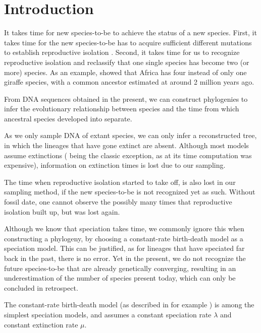 \section{Introduction}


It takes time for new species-to-be to achieve the status of a new species.
First, it takes time for the new species-to-be has 
to acquire sufficient different mutations to 
establish reproductive isolation \cite{schluter2001ecology}. Second, 
it takes time for us to recognize reproductive isolation
and reclassify that one single species has become two 
(or more) species. As an example, \cite{fennessy2016multi} 
showed that Africa has four instead of only one
giraffe species, with a common ancestor estimated 
at around 2 million years ago.


From DNA sequences obtained in the present, we can construct phylogenies
to infer the evolutionary relationship between species and the time 
from which ancestral species developed into separate.
  
As we only sample DNA of extant species, 
we can only infer a reconstructed tree, in which
the lineages that have gone extinct are absent.
Although most models assume extinctions (\cite{yule1925mathematical} being the
classic exception, as at its time computation was expensive), 
information on extinction times is lost due to our sampling.


The time when reproductive isolation started to take off, is
also lost in our sampling method, if the new species-to-be is not 
recognized yet as such. Without fossil date, one cannot observe the
possibly many times that reproductive isolation built up, but was lost again.


Although we know that speciation takes time, we commonly ignore this when
constructing a phylogeny, by choosing a constant-rate birth-death model
as a speciation model. This can be justified, as for lineages 
that have speciated far back in the past, there is no error. 
Yet in the present, we do not recognize the future species-to-be
that are already genetically converging, resulting in an underestimation
of the number of species present today, which can only be 
concluded in retrospect.

The constant-rate birth-death model (as described in for example \cite{nee1994reconstructed}) 
is among the simplest speciation models, and assumes a constant speciation
 rate $\lambda$ and constant extinction rate $\mu$.

